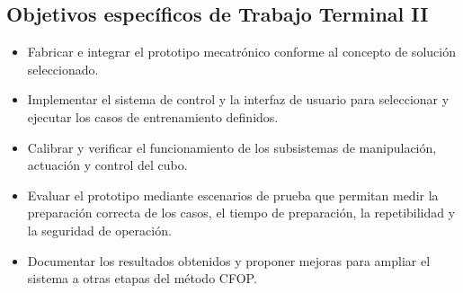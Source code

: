 \subsection{Objetivos específicos de Trabajo Terminal II}
\begin{itemize}
    \item Fabricar e integrar el prototipo mecatrónico conforme al concepto de solución seleccionado.

    \item Implementar el sistema de control y la interfaz de usuario para seleccionar y ejecutar los casos de entrenamiento definidos.

    \item Calibrar y verificar el funcionamiento de los subsistemas de manipulación, actuación y control del cubo.

    \item Evaluar el prototipo mediante escenarios de prueba que permitan medir la preparación correcta de los casos, el tiempo de preparación, la repetibilidad y la seguridad de operación.

    \item Documentar los resultados obtenidos y proponer mejoras para ampliar el sistema a otras etapas del método CFOP.
\end{itemize}

\clearpage
